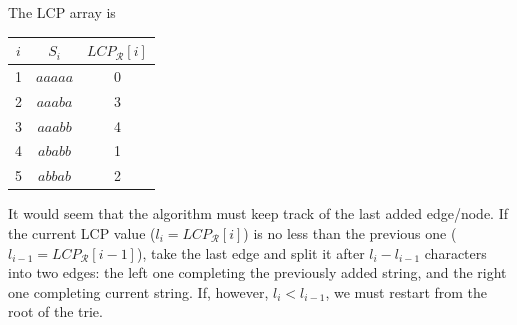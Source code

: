 \documentclass[10pt]{article}
\begin{document}
The LCP array is
\begin{center}
\begin{tabular}{|c|c|c|}
\hline
$i$ & $S_i$ & $LCP_{\mathcal{R}}[i]$ \\
\hline 
1 & $aaaaa$ & 0 \\
2 & $aaaba$ & 3 \\
3 & $aaabb$ & 4 \\
4 & $ababb$ & 1 \\
5 & $abbab$ & 2 \\
\hline
\end{tabular}
\end{center}
It would seem that the algorithm must keep track of the last added edge/node. If the current LCP value ($l_i = LCP_{\mathcal{R}}[i]$)  is no less than the previous one ($l_{i - 1} = LCP_{\mathcal{R}}[i - 1]$), take the last edge and split it after $l_i - l_{i - 1}$ characters into two edges: the left one completing the previously added string, and the right one completing current string. If, however, $l_i < l_{i - 1}$, we must restart from the root of the trie.
\end{document}
